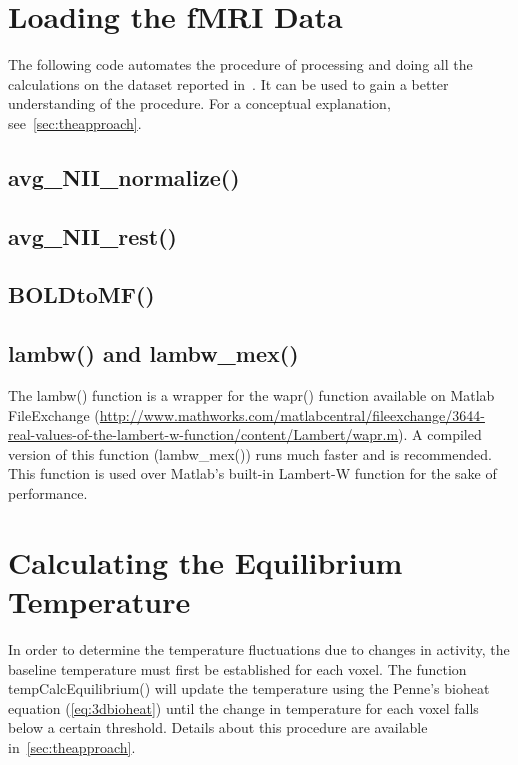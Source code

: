 \section{Loading the fMRI Data}
The following code automates the procedure of processing and doing all the calculations on the dataset reported in~\citet{dhamala}.  It can be used to gain a better understanding of the procedure. For a conceptual explanation, see~\cref{sec:theapproach}.

\subsection{avg\_NII\_normalize()}

\subsection{avg\_NII\_rest()}

\subsection{BOLDtoMF()}

\subsection{lambw() and lambw\_mex()}
The lambw() function is a wrapper for the wapr() function available on Matlab FileExchange (\url{http://www.mathworks.com/matlabcentral/fileexchange/3644-real-values-of-the-lambert-w-function/content/Lambert/wapr.m}).  A compiled version of this function (lambw\_mex()) runs much faster and is recommended.  This function is used over Matlab's built-in Lambert-W function for the sake of performance.

\clearpage
\section{Calculating the Equilibrium Temperature}
In order to determine the temperature fluctuations due to changes in activity, the baseline temperature must first be established for each voxel.  The function tempCalcEquilibrium() will update the temperature using the Penne's bioheat equation (\cref{eq:3dbioheat}) until the change in temperature for each voxel falls below a certain threshold.  Details about this procedure are available in~\cref{sec:theapproach}.

\clearpage
